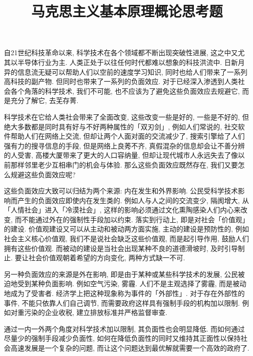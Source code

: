 \documentclass[UTF8,9pt]{ctexart}
\title{马克思主义基本原理概论思考题}
\begin{document}
 
\maketitle
{}
自21世纪科技革命以来, 科学技术在各个领域都不断出现突破性进展, 这之中又尤其以半导体行业为主. 人类正处于以往任何时代都难以想象的科技洪流中. 日新月异的信息流无疑可以帮助人们以空前的速度学习知识, 同时也给人们带来了一系列高科技的副产物. 但同时也带来了一系列的负面效应. 对于已经深入渗透到人类社会各个角落的科学技术, 我们不可能, 也不应该为了避免这些负面效应去规避它, 而是充分了解它, 去芜存菁. 
    
科学技术在它给人类社会带来了全面改变, 这些改变一些是好的, 一些是不好的, 但绝大多数都是同时具有好与不好两种属性的「双刃剑」, 例如人们常说的, 社交软件帮助人们在网络上交流, 但却让两个人面对面的交流减少了, 搜索引擎给了人们强有力的搜寻信息的手段, 但是网络上良莠不齐, 真假混杂的信息却会让不善分辨的人受害, 高楼大厦带来了更大的人口容纳量, 但却让现代城市人永远失去了像以前那样邻里老少互相串门的机会与体验. 那么这些负面效应既然存在, 我们又要怎么规避这些负面效应呢? 
    
这些负面效应大致可以归结为两个来源: 内在发生和外界影响. 公民受科学技术影响而产生的负面效应即使内在发生类的. 例如人与人之间的交流变少, 隔阂增大, 从「人情社会」进入「冷漠社会」, 这样的影响必须通过文化熏陶感染人们内心来改变, 而不能通过外在的强制性手段加以约束. 落实到行动上, 即是对社会「价值观」的建设. 价值观建设又可以从主动和被动两方面实施, 主动的建设是预防性的, 例如社会主义核心价值观, 我们不是说社会缺乏这些价值观, 而是起引导作用, 鼓励人们拥有这些价值观. 而被动的建设是当社会出现某种不良的道德滑坡时, 及时引导制止. 要让社会价值观朝着希望的方向变化, 两种方式缺一不可. 

另一种负面效应的来源是外在影响, 即是由于某种或某些科学技术的发展, 公民被迫地受到某种负面影响. 例如空气污染, 雾霾. 人们不是主观选择了雾霾, 而是被动地成为了受害者. 经济学上把这种现象称为事件的「外部性」. 对于存在外部性的事件, 不能只依靠人们自己调节, 而需要政府这样具有强制手段的机构加以限制. 例如对重污染的企业收税, 建立排放标准并严格监督审查. 

通过一内一外两个角度对科学技术加以限制, 其负面性也会明显降低. 而如何通过尽量少的强制手段减少负面性, 如何在降低负面性的同时又维持其正面性以保持社会高速发展是一个复杂的问题, 而让这个问题达到最优解就需要一个高效的政府了. 
\end{document}

